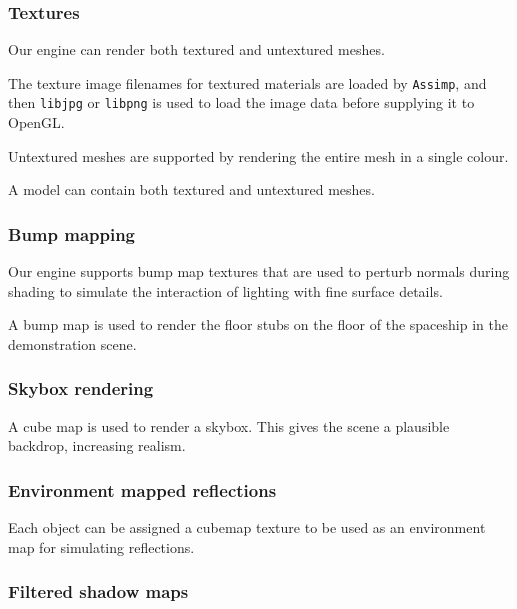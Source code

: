 \documentclass[11pt]{scrartcl} %
\newcommand{\libraryname}[1]{{\texttt{#1}}}
\begin{document}
        \subsubsection{Textures}

            Our engine can render both textured and untextured meshes.

            The texture image filenames for textured materials are loaded by
            \libraryname{Assimp}, and then \libraryname{libjpg} or
            \libraryname{libpng} is used to load the image data before
            supplying it to OpenGL.

            Untextured meshes are supported by rendering the entire mesh in a
            single colour.

            A model can contain both textured and untextured meshes.

        \subsubsection{Bump mapping}

            Our engine supports bump map textures that are used to perturb
            normals during shading to simulate the interaction of lighting with
            fine surface details.

            A bump map is used to render the floor stubs
            on the floor of the spaceship in the demonstration scene.

        \subsubsection{Skybox rendering}

            A cube map is used to render a skybox. This gives the scene a
            plausible backdrop, increasing realism.

        \subsubsection{Environment mapped reflections}

            Each object can be assigned a cubemap texture to be used as an
            environment map for simulating reflections.

        \subsubsection{Filtered shadow maps}
\end{document}
